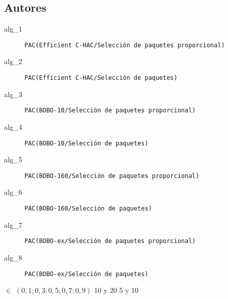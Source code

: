 \subsection{Autores}
\Solucion {}
{
\begin{description}
		\item[alg\_1] \texttt{PAC(Efficient C-HAC/Selección de paquetes proporcional)}
		\item[alg\_2] \texttt{PAC(Efficient C-HAC/Selección de paquetes)}
		\item[alg\_3] \texttt{PAC(BOBO-10/Selección de paquetes proporcional)}
		\item[alg\_4] \texttt{PAC(BOBO-10/Selección de paquetes)}
		\item[alg\_5] \texttt{PAC(BOBO-160/Selección de paquetes proporcional)}
		\item[alg\_6] \texttt{PAC(BOBO-160/Selección de paquetes)}
		\item[alg\_7] \texttt{PAC(BOBO-ex/Selección de paquetes proporcional)}
		\item[alg\_8] \texttt{PAC(BOBO-ex/Selección de paquetes)}
\end{description}
}
{$\in$ $(0,1; 0,3; 0,5; 0,7; 0,9)$}
{10 y 20}
{5 y 10}
